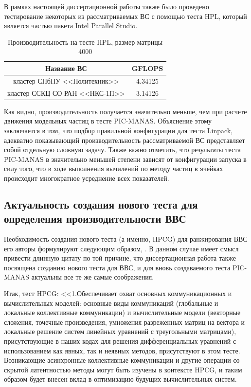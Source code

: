 В рамках настоящей диссертационной работы также было проведено тестирование некоторых из рассматриваемых ВС с помощью теста HPL, который является частью пакета Intel Parallel Studio. 

\begin{table}[ht]
\caption{Производительность на тесте HPL, размер матрицы 4000}
\begin{center}
\begin{tabular}{|c|c|}
	\hline
	Название ВС                & GFLOPS \\ \hline
кластер СПбПУ <<Политехник>>   &  4.34125 	          \\  
кластер ССКЦ СО РАН <<НКС-1П>> &  3.14126 	      \\ \hline
\end{tabular}
\end{center}
\label{}
\end{table}

Как видно, производительность получается значительно меньше, чем при расчете движения модельных частиц в тесте PIC-MANAS. Объяснение этому заключается  в том, что  подбор правильной конфигурации для теста Linpack, адекватно показывающий производительность рассматриваемой ВС представляет собой отдельную сложную задачу. Также важно отметить, что результаты теста PIC-MANAS в значительно меньшей степени зависят от конфигурации запуска в силу того, что в ходе выполнения вычилений по методу частиц в ячейках происходит многократное усреднение всех показателей.



\subsection{Актуальность создания нового теста для определения производительности ВВС}
Необходимость создания нового теста (а именно, HPCG) для ранжирования ВВС его авторы формулируют следующим образом, \cite{HerouxHPCG}. В данном случае имеет смысл привести длинную цитату по той причине, что диссертационная работа также посвящена созданию нового теста для ВВС, и для вновь создаваемого теста PIC-MANAS актуальны все те же самые соображения.

Итак, тест HPCG:
<<1.Обеспечивает охват основных коммуникационных и вычислительных моделей:
основные виды коммуникаций (глобальные и локальные коллективные коммуникации) и вычислительные модели
(векторные сложения, точечные произведения, умножения разреженных матриц на вектора и локальные решение систем линейных уравнений с треугольными матрицами), присутствующие в наших кодах для решения дифференциальных уравнений с использованием как явных, так и неявных методов,
присутствуют в этом тесте. Возникающие асинхронные коллективные коммуникации и другие операции со скрытой латентностью методы могут быть изучены в контексте HPCG, и таким образом будет внесен вклад в оптимизацию будущих вычислительных систем.

